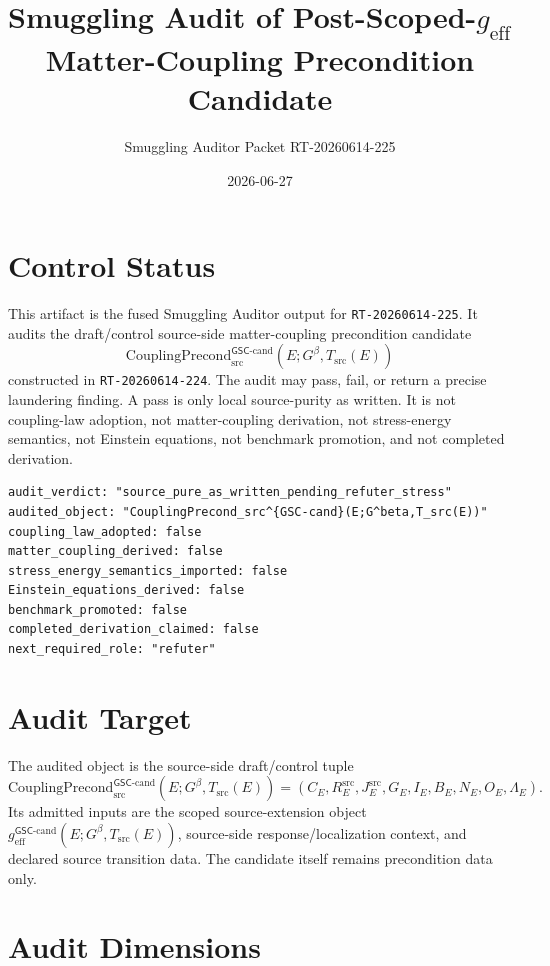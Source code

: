 \documentclass[11pt]{article}
\title{Smuggling Audit of Post-Scoped-\texorpdfstring{$g_{\mathrm{eff}}$}{g_eff} Matter-Coupling Precondition Candidate}
\author{Smuggling Auditor Packet RT-20260614-225}
\date{2026-06-27}
\newcommand{\Gbeta}{G^\beta}
\newcommand{\geffCand}{g_{\mathrm{eff}}^{\mathsf{GSC}\mbox{-}\mathrm{cand}}}
\newcommand{\CouplingPrecond}{\mathrm{CouplingPrecond}^{\mathsf{GSC}\mbox{-}\mathrm{cand}}_{\mathrm{src}}}
\begin{document}
\maketitle

\section{Control Status}

This artifact is the fused Smuggling Auditor output for
\texttt{RT-20260614-225}. It audits the draft/control source-side
matter-coupling precondition candidate
\[
  \CouplingPrecond(E;\Gbeta,T_{\mathrm{src}}(E))
\]
constructed in \texttt{RT-20260614-224}. The audit may pass, fail, or return a
precise laundering finding. A pass is only local source-purity as written. It
is not coupling-law adoption, not matter-coupling derivation, not
stress-energy semantics, not Einstein equations, not benchmark promotion, and
not completed derivation.

\begin{verbatim}
audit_verdict: "source_pure_as_written_pending_refuter_stress"
audited_object: "CouplingPrecond_src^{GSC-cand}(E;G^beta,T_src(E))"
coupling_law_adopted: false
matter_coupling_derived: false
stress_energy_semantics_imported: false
Einstein_equations_derived: false
benchmark_promoted: false
completed_derivation_claimed: false
next_required_role: "refuter"
\end{verbatim}

\section{Audit Target}

The audited object is the source-side draft/control tuple
\[
  \CouplingPrecond(E;\Gbeta,T_{\mathrm{src}}(E)) =
  (C_E,R^{\mathrm{src}}_E,J^{\mathrm{src}}_E,G_E,I_E,B_E,N_E,O_E,\Lambda_E).
\]
Its admitted inputs are the scoped source-extension object
\(\geffCand(E;\Gbeta,T_{\mathrm{src}}(E))\), source-side
response/localization context, and declared source transition data. The
candidate itself remains precondition data only.

\section{Audit Dimensions}
\end{document}
